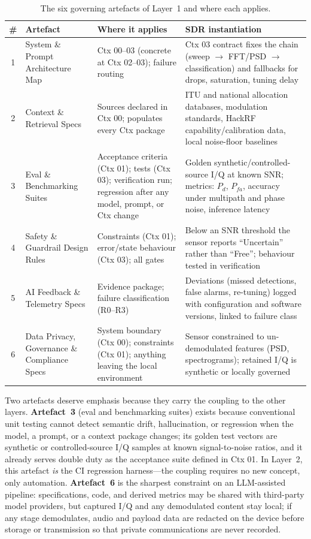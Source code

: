 \documentclass[11pt,a4paper]{article}
\begin{document}
\begin{table}[htbp]
\centering
\caption{The six governing artefacts of Layer~1 and where each applies.}
\label{tab:artefacts}
\small
\setlength{\tabcolsep}{5pt}
\begin{tabular}{@{}clp{4.4cm}p{6.2cm}@{}}
\toprule
\textbf{\#} & \textbf{Artefact} & \textbf{Where it applies} & \textbf{SDR instantiation} \\
\midrule
1 & System \& Prompt Architecture Map & Ctx 00--03 (concrete at Ctx 02--03); failure routing & Ctx 03 contract fixes the chain (sweep $\rightarrow$ FFT/PSD $\rightarrow$ classification) and fallbacks for drops, saturation, tuning delay \\
2 & Context \& Retrieval Specs & Sources declared in Ctx 00; populates every Ctx package & ITU and national allocation databases, modulation standards, HackRF capability/calibration data, local noise-floor baselines \\
3 & Eval \& Benchmarking Suites & Acceptance criteria (Ctx 01); tests (Ctx 03); verification run; regression after any model, prompt, or Ctx change & Golden synthetic/controlled-source I/Q at known SNR; metrics: $P_d$, $P_{fa}$, accuracy under multipath and phase noise, inference latency \\
4 & Safety \& Guardrail Design Rules & Constraints (Ctx 01); error/state behaviour (Ctx 03); all gates & Below an SNR threshold the sensor reports ``Uncertain'' rather than ``Free''; behaviour tested in verification \\
5 & AI Feedback \& Telemetry Specs & Evidence package; failure classification (R0--R3) & Deviations (missed detections, false alarms, re-tuning) logged with configuration and software versions, linked to failure class \\
6 & Data Privacy, Governance \& Compliance Specs & System boundary (Ctx 00); constraints (Ctx 01); anything leaving the local environment & Sensor constrained to un-demodulated features (PSD, spectrograms); retained I/Q is synthetic or locally governed \\
\bottomrule
\end{tabular}
\end{table}

Two artefacts deserve emphasis because they carry the coupling to the other layers. \textbf{Artefact~3}
(eval and benchmarking suites) exists because conventional unit testing cannot detect semantic
drift, hallucination, or regression when the model, a prompt, or a context package changes; its
golden test vectors are synthetic or controlled-source I/Q samples at known signal-to-noise
ratios, and it already serves double duty as the acceptance suite defined in Ctx 01. In
Layer~2, this artefact \emph{is} the CI regression harness---the coupling requires no new
concept, only automation. \textbf{Artefact~6} is the sharpest constraint on an LLM-assisted
pipeline: specifications, code, and derived metrics may be shared with third-party model
providers, but captured I/Q and any demodulated content stay local; if any stage demodulates,
audio and payload data are redacted on the device before storage or transmission so that private
communications are never recorded.
\end{document}
